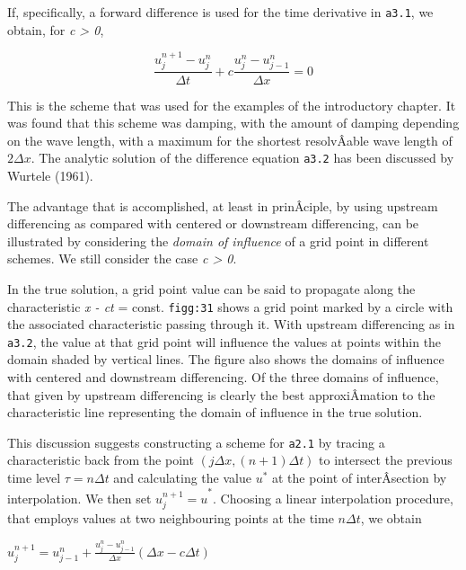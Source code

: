 If, specifically, a forward difference is used for the time derivative
in \texttt{a3.1}, we obtain, for \emph{c \textgreater{} 0},

{\[\frac{u_j^{n + 1} - u_j^{n}}{\Delta t}
+c \frac{u_j^{n} - u_{j - 1}^{n}}{\Delta x} = 0\]}

This is the scheme that was used for the examples of the introductory
chapter. It was found that this scheme was damping, with the amount of
damping depending on the wave length, with a maximum for the shortest
resolvÂ­able wave length of \(2\Delta x\). The analytic solution of the
difference equation \texttt{a3.2} has been discussed by Wurtele (1961).

The advantage that is accomplished, at least in prinÂ­ciple, by using
upstream differencing as compared with centered or downstream
differencing, can be illustrated by considering the \emph{domain of
influence} of a grid point in different schemes. We still consider the
case \emph{c \textgreater{} 0}.

\begin{figure}
\centering
{}
\caption{}
\end{figure}

In the true solution, a grid point value can be said to propagate along
the characteristic \emph{x - ct} = const. \texttt{figg:31} shows a grid
point marked by a circle with the associated characteristic passing
through it. With upstream differencing as in \texttt{a3.2}, the value at
that grid point will influence the values at points within the domain
shaded by vertical lines. The figure also shows the domains of influence
with centered and downstream differencing. Of the three domains of
influence, that given by upstream differencing is clearly the best
approxiÂ­mation to the characteristic line representing the domain of
influence in the true solution.

This discussion suggests constructing a scheme for \texttt{a2.1} by
tracing a characteristic back from the point
\(\left( j\Delta x,\left( n + 1 \right)\Delta t \right)\) to intersect
the previous time level \(\tau = n\Delta t\) and calculating the value
\(u^{*}\) at the point of interÂ­section by interpolation. We then set
\({u_{j}^{n + 1} = u}^{*}\). Choosing a linear interpolation procedure,
that employs values at two neighbouring points at the time
\(n\Delta t\), we obtain

\(u_{j}^{n + 1} = u_{j - 1}^{n} + \frac{u_{j}^{n} - u_{j - 1}^{n}}{\Delta x}\left( \Delta x - c\Delta t \right)\)


